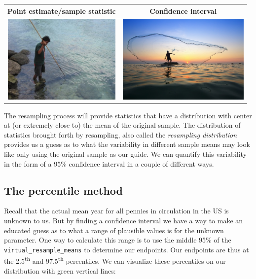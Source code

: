 \documentclass[12pt, krantz2,]{krantz}
\begin{document}
\begin{longtable}[]{@{}cc@{}}
\toprule
Point estimate/sample statistic & Confidence interval\tabularnewline
\midrule
\endhead
\includegraphics[width=\textwidth,height=1.7in]{images/spear.jpg} & \includegraphics[width=\textwidth,height=1.7in]{images/net2.jpg}\tabularnewline
\bottomrule
\end{longtable}

The resampling process will provide statistics that have a distribution with center at (or extremely close to) the mean of the original sample. The distribution of statistics brought forth by resampling, also called the \emph{resampling distribution} provides us a guess as to what the variability in different sample means may look like only using the original sample as our guide. We can quantify this variability in the form of a 95\% confidence interval in a couple of different ways.

\hypertarget{percentile-method}{%
\subsection{The percentile method}\label{percentile-method}}

Recall that the actual mean year for all pennies in circulation in the US is unknown to us. But by finding a confidence interval we have a way to make an educated guess as to what a range of plausible values is for the unknown parameter. One way to calculate this range is to use the middle 95\% of the \texttt{virtual\_resample\_means} to determine our endpoints. Our endpoints are thus at the 2.5\textsuperscript{th} and 97.5\textsuperscript{th} percentiles. We can visualize these percentiles on our distribution with green vertical lines:
\end{document}

